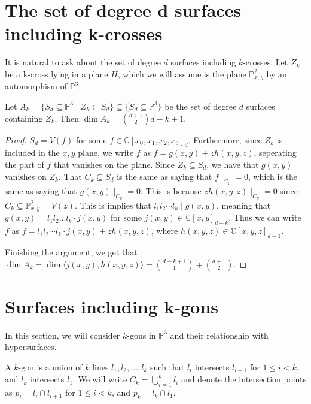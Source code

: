 \section{The set of degree d surfaces including k-crosses}

It is natural to ask about the set of degree $d$ surfaces including $k$-crosses. Let $Z_k$ be a k-cross lying in a plane $H$, which we will assume is the plane $\mathbb{P}^2_{x,y}$ by an automorphism of $\mathbb{P}^3$. 

\begin{proposition}
    Let $A_k = \{S_d \subseteq \mathbb{P}^3 \mid Z_k \subset S_d\} \subseteq \{S_d \subseteq \mathbb{P}^3\}$ be the set of degree $d$ surfaces containing $Z_k$. Then $\dim{A_k} = \binom{d+1}{2} d-k+1$.
\end{proposition}

\begin{proof}
    $S_d = V(f)$ for some $f \in \mathbb{C}[x_0, x_1, x_2, x_3]_d$. Furthermore, since $Z_k$ is included in the $x,y$ plane, we write $f$ as $f = g(x,y) + zh(x,y,z)$, seperating the part of $f$ that vanishes on the plane. Since $Z_k \subseteq S_d$, we have that $g(x,y)$ vanishes on $Z_k$. That $C_k \subseteq S_d$ is the same as saying that $f\mid_{C_k} = 0$, which is the same as saying that $g(x,y) \mid_{C_k} = 0$. This is because $zh(x,y,z) \mid_{C_k} = 0$ since $C_k \subseteq \mathbb{P}^2_{x,y} = V(z)$. This is implies that $l_1l_2 \cdots l_k \mid g(x,y)$, meaning that $g(x,y) = l_1l_2 \dots l_k \cdot j(x,y)$ for some $j(x,y) \in \mathbb{C}[x,y]_{d-k}$. Thus we can write $f$ as $f = l_1l_2 \cdots l_k \cdot j(x,y) + zh(x,y,z)$, where $h(x,y,z) \in \mathbb{C}[x,y,z]_{d-1}$.

    Finishing the argument, we get that $\dim{A_k} = \dim \langle j(x,y), h(x,y,z) \rangle = \binom{d-k+1}{1} + \binom{d+1}{2}$. 
\end{proof}

\section{Surfaces including k-gons}

In this section, we will consider $k$-gons in $\mathbb{P}^3$ and their relationship with hypersurfaces.

\begin{definition}
    A $k$-gon is a union of $k$ lines $l_1, l_2, \dots, l_k$ such that $l_i$ intersects $l_{i+1}$ for $1 \leq i < k$, and $l_k$ intersects $l_1$. We will write $C_k = \bigcup_{i=1}^k l_i$ and denote the intersection points as $p_i = l_i \cap l_{i+1}$ for $1 \leq i < k$, and $p_k = l_k \cap l_1$.
\end{definition}

